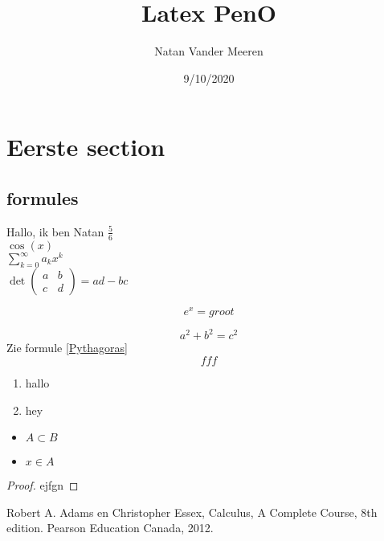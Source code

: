 \documentclass[a4paper,11pt]{article}
\title{Latex PenO}
\author{Natan Vander Meeren}
\date{9/10/2020}
\begin{document}
	\maketitle
	
	\section{Eerste section}
	\subsection{formules}
	Hallo, ik ben Natan $\frac{5}{6}$	\\
	
	$\cos(x)$	\\
	
	$\sum_{k=0}^\infty a_kx^k$	\\
	
	$\det
	\begin{pmatrix}
	a & b \\
	c & d
	\end{pmatrix}
	= ad - bc
	$
	
	\begin{equation} \label{formule1}
		e^x = groot
	\end{equation}
	
	\begin{equation*}\label{Pythagoras}
		a^2+b^2=c^2
	\end{equation*}
	Zie formule \ref{Pythagoras}
	\begin{equation}
		fff
	\end{equation}
	
	
	\begin{enumerate}
		\item hallo
		\item hey
	\end{enumerate}
	
	
	\begin{itemize}
		\item $A \subset B$
		\item $x \in A$
	\end{itemize}
	
	
	\begin{proof}
		ejfgn
	\end{proof}
	
	
	\cite{referentie1}
	
	
	\begin{thebibliography}{5}
		 Robert A. Adams en Christopher Essex, Calculus, A Complete Course, 8th edition. Pearson Education Canada, 2012.
	\end{thebibliography}
	
\end{document}
